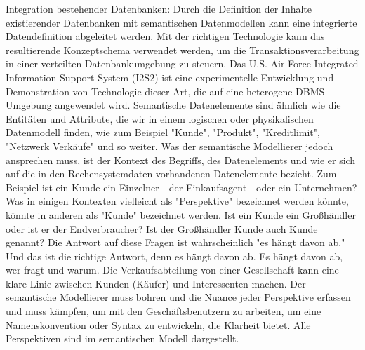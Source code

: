 Integration bestehender Datenbanken: Durch die Definition der Inhalte existierender Datenbanken mit semantischen Datenmodellen kann eine integrierte Datendefinition abgeleitet werden. Mit der richtigen Technologie kann das resultierende Konzeptschema verwendet werden, um die Transaktionsverarbeitung in einer verteilten Datenbankumgebung zu steuern. Das U.S. Air Force Integrated Information Support System (I2S2) ist eine experimentelle Entwicklung und Demonstration von Technologie dieser Art, die auf eine heterogene DBMS-Umgebung angewendet wird. \cite{gray2004}
Semantische Datenelemente sind ähnlich wie die Entitäten und Attribute, die wir in einem logischen oder physikalischen Datenmodell finden, wie zum Beispiel "{}Kunde"{}, "{}Produkt"{}, "{}Kreditlimit"{}, "{}Netzwerk Verkäufe"{} und so weiter. Was der semantische Modellierer jedoch ansprechen muss, ist der Kontext des Begriffs, des Datenelements und wie er sich auf die in den Rechensystemdaten vorhandenen Datenelemente bezieht. Zum Beispiel ist ein Kunde ein Einzelner - der Einkaufsagent - oder ein Unternehmen? Was in einigen Kontexten vielleicht als "{}Perspektive"{} bezeichnet werden könnte, könnte in anderen als "{}Kunde"{} bezeichnet werden. Ist ein Kunde ein Großhändler oder ist er der Endverbraucher? Ist der Großhändler Kunde auch Kunde genannt? Die Antwort auf diese Fragen ist wahrscheinlich "{}es hängt davon ab."{} Und das ist die richtige Antwort, denn es hängt davon ab. Es hängt davon ab, wer fragt und warum. Die Verkaufsabteilung von einer Gesellschaft kann eine klare Linie zwischen Kunden (Käufer) und Interessenten machen. 
Der semantische Modellierer muss bohren und die Nuance jeder Perspektive erfassen und muss kämpfen, um mit den Geschäftsbenutzern zu arbeiten, um eine Namenskonvention oder Syntax zu entwickeln, die Klarheit bietet. Alle Perspektiven sind im semantischen Modell dargestellt. \cite{hammer2008}

